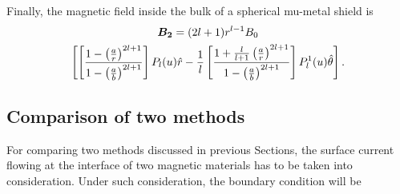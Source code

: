 


Finally, the magnetic field inside the bulk of a spherical mu-metal shield is
\begin{multline}\label{B}
\bm{B_2}=(2l+1)r^{l-1} B_0  \\
\left[ \left[\frac{1-\left(\frac{a}{r}\right)^{2l+1}}{1-\left(\frac{a}{b}\right)^{2l+1}}\right]P_l(u) \hat{r} -\frac{1}{l}\left[\frac{1+\frac{l}{l+1}\left(\frac{a}{r}\right)^{2l+1}}{1-\left(\frac{a}{b}\right)^{2l+1}}\right] P_l^1(u)\hat{\theta} \right]{\rm .}
\end{multline}


\subsection{Comparison of two methods}
For comparing two methods discussed in previous Sections, the surface current flowing at the interface of two magnetic materials has to be taken into consideration. Under such consideration, the boundary condition will be


